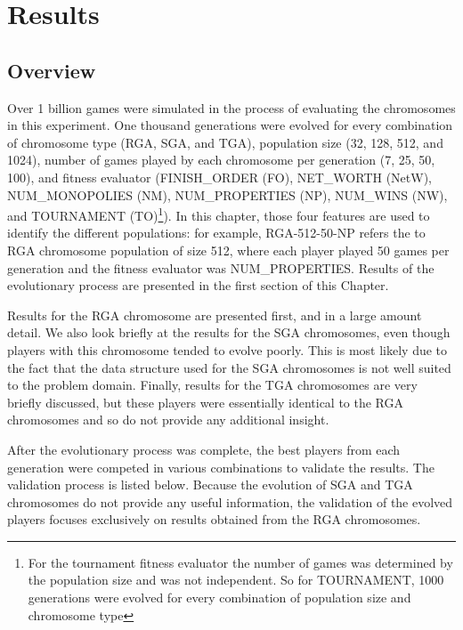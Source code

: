 \clearpage
\chapter{Results}\label{chap:results}

\section{Overview}

Over 1 billion games were simulated in the process of evaluating the chromosomes
in this experiment. One thousand generations were evolved for every combination
of chromosome type (RGA, SGA, and TGA), population size (32, 128, 512, and
1024), number of games played by each chromosome per generation (7, 25, 50,
100), and fitness evaluator (FINISH\_ORDER (FO), NET\_WORTH (NetW),
NUM\_MONOPOLIES (NM), NUM\_PROPERTIES (NP), NUM\_WINS (NW), and TOURNAMENT
(TO)\footnote{For the tournament fitness evaluator the number of games was
determined by the population size and was not independent. So for TOURNAMENT,
1000 generations were evolved for every combination of population size and
chromosome type}). In this chapter, those four features are used to identify the
different populations: for example, RGA-512-50-NP refers the to RGA chromosome
population of size 512, where each player played 50 games per generation and the
fitness evaluator was NUM\_PROPERTIES. Results of the evolutionary process are
presented in the first section of this Chapter.

Results for the RGA chromosome are presented first, and in a large amount
detail. We also look briefly at the results for the SGA chromosomes, even though
players with this chromosome tended to evolve poorly. This is most likely due to
the fact that the data structure used for the SGA chromosomes is not well suited
to the problem domain. Finally, results for the TGA chromosomes are very briefly
discussed, but these players were essentially identical to the RGA chromosomes
and so do not provide any additional insight.

After the evolutionary process was complete, the best players from each
generation were competed in various combinations to validate the results. The
validation process is listed below. Because the evolution of SGA and TGA
chromosomes do not provide any useful information, the validation of the evolved
players focuses exclusively on results obtained from the RGA chromosomes.

